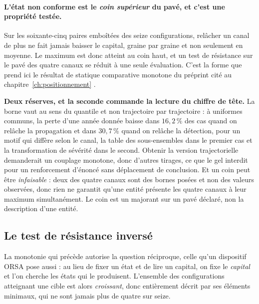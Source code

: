 \paragraph{L'état non conforme est le \emph{coin supérieur} du pavé, et c'est une propriété
testée.} Sur les soixante-cinq paires emboîtées des seize configurations, relâcher un canal de plus
ne fait jamais baisser le capital, graine par graine et non seulement en moyenne. Le maximum est
donc atteint au coin haut, et un test de résistance sur le pavé des quatre canaux se réduit à une
seule évaluation. C'est la forme que prend ici le résultat de statique comparative monotone du
préprint cité au chapitre~\ref{ch:positionnement} \citep{ccrn2026}.

\begin{attention}
\textbf{Deux réserves, et la seconde commande la lecture du chiffre de tête.} La borne vaut au sens
du quantile et non trajectoire par trajectoire : à uniformes communs, la perte d'une année donnée
baisse dans $16{,}2\,\%$ des cas quand on relâche la propagation et dans $30{,}7\,\%$ quand on
relâche la détection, pour un motif qui diffère selon le canal, la table des sous-ensembles dans le
premier cas et la transformation de sévérité dans le second. Obtenir la version trajectorielle
demanderait un couplage monotone, donc d'autres tirages, ce que le gel interdit pour un
renforcement d'énoncé sans déplacement de conclusion. Et un coin peut être \emph{infaisable} :
deux des quatre canaux sont des bornes posées et non des valeurs observées, donc rien ne garantit
qu'une entité présente les quatre canaux à leur maximum simultanément. Le coin est un majorant sur
un pavé déclaré, non la description d'une entité.
\end{attention}

\subsection{Le test de résistance inversé}
\label{sec:inverse}

La monotonie qui précède autorise la question réciproque, celle qu'un dispositif ORSA pose aussi :
au lieu de fixer un état et de lire un capital, on fixe le \emph{capital} et l'on cherche les états
qui le produisent. L'ensemble des configurations atteignant une cible est alors \emph{croissant},
donc entièrement décrit par ses éléments minimaux, qui ne sont jamais plus de quatre sur seize.

